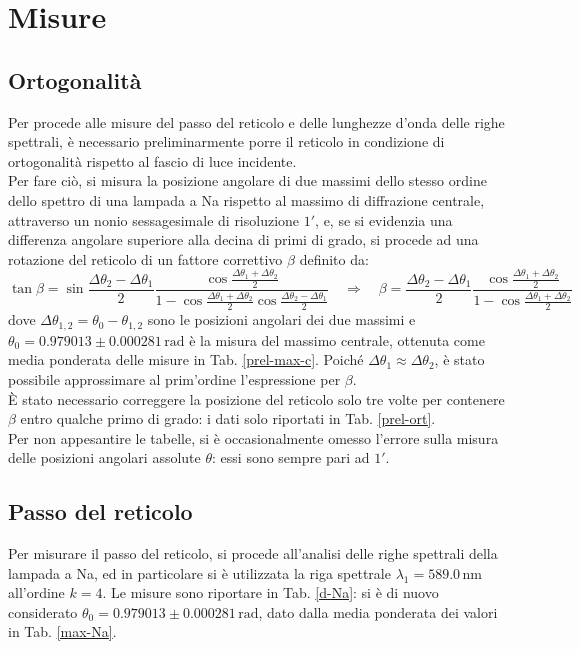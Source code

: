 \documentclass[]{article}
\let\oldsection\section%
\renewcommand{\section}{%
	\renewcommand{\theequation}{\thesection.\arabic{equation}}%
	\oldsection}%
\let\oldsubsection\subsection%
\renewcommand{\subsection}{%
	\renewcommand{\theequation}{\thesubsection.\arabic{equation}}%
	\oldsubsection}%
\begin{document}
    \section{Misure}
    \label{par:misure}

    \subsection{Ortogonalità}
    Per procede alle misure del passo del reticolo e delle lunghezze d'onda delle righe spettrali, è necessario preliminarmente porre il reticolo in condizione di ortogonalità rispetto al fascio di luce incidente. \\
    Per fare ciò, si misura la posizione angolare di due massimi dello stesso ordine dello spettro di una lampada a Na rispetto al massimo di diffrazione centrale, attraverso un nonio sessagesimale di risoluzione $1'$, e, se si evidenzia una differenza angolare superiore alla decina di primi di grado, si procede ad una rotazione del reticolo di un fattore correttivo $\beta$ definito da:
    \begin{equation}
        \label{beta}
        \tan{\beta} = \sin{\frac{\Delta\theta_2 - \Delta\theta_1}{2}} \frac{\cos{\frac{\Delta\theta_1 + \Delta\theta_2}{2}}}{1 - \cos{\frac{\Delta\theta_1 + \Delta\theta_2}{2}} \cos{\frac{\Delta\theta_2 - \Delta\theta_1}{2}}} \quad\Longrightarrow\quad
        \beta = \frac{\Delta\theta_2 - \Delta\theta_1}{2} \frac{\cos{\frac{\Delta\theta_1 + \Delta\theta_2}{2}}}{1 - \cos{\frac{\Delta\theta_1 + \Delta\theta_2}{2}}}
    \end{equation}
    dove $\Delta\theta_{1,2} = \theta_0 - \theta_{1,2}$ sono le posizioni angolari dei due massimi e $\theta_0 = 0.979013 \pm 0.000281 \,\text{rad}$ è la misura del massimo centrale, ottenuta come media ponderata delle misure in Tab. \ref{prel-max-c}. Poiché $\Delta\theta_1 \approx \Delta\theta_2$, è stato possibile approssimare al prim'ordine l'espressione per $\beta$. \\
    È stato necessario correggere la posizione del reticolo solo tre volte per contenere $\beta$ entro qualche primo di grado: i dati solo riportati in Tab. \ref{prel-ort}. \\
    Per non appesantire le tabelle, si è occasionalmente omesso l'errore sulla misura delle posizioni angolari assolute $\theta$: essi sono sempre pari ad $1'$.

    \subsection{Passo del reticolo}
    Per misurare il passo del reticolo, si procede all'analisi delle righe spettrali della lampada a Na, ed in particolare si è utilizzata la riga spettrale $\lambda_1 = 589.0\,\text{nm}$ all'ordine $k=4$. Le misure sono riportare in Tab. \ref{d-Na}: si è di nuovo considerato $\theta_0 = 0.979013 \pm 0.000281 \,\text{rad}$, dato dalla media ponderata dei valori in Tab. \ref{max-Na}.
\end{document}
